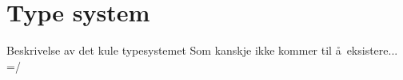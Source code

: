 \section{Type system}
\label{sect:type_system}
Beskrivelse av det kule typesystemet Som kanskje ikke kommer til \aa~eksistere... =/